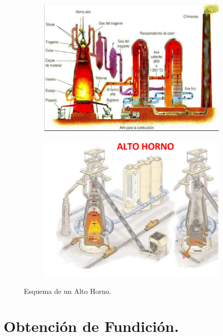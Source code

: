 \documentclass[12pt,a4paper]{article}
\begin{document}
\begin{figure}[h!]
    \centering
    \begin{subfigure}{0.45\textwidth}
        \centering
        \includegraphics[width=\textwidth]{Inagenes para latex/Alto horno.png}
    \end{subfigure}
    \hfill
    \begin{subfigure}{0.45\textwidth}
        \centering
        \includegraphics[width=\textwidth]{Inagenes para latex/alto horno 2.png}
    \end{subfigure}
    \caption{Esquema de un Alto Horno.}
    \label{fig:alto_horno}
\end{figure}

\section{Obtención de Fundición.}
\end{document}
